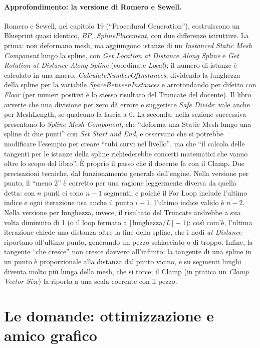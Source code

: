 \paragraph{Approfondimento: la versione di Romero e Sewell.} Romero e Sewell, nel capitolo 19
(``Procedural Generation''), costruiscono un Blueprint quasi identico, \emph{BP\_SplinePlacement},
con due differenze istruttive. La prima: non deformano mesh, ma aggiungono istanze di un
\emph{Instanced Static Mesh Component} lungo la spline, con \emph{Get Location at Distance Along
Spline} e \emph{Get Rotation at Distance Along Spline} (coordinate \emph{Local}); il numero di
istanze è calcolato in una macro, \emph{CalculateNumberOfInstances}, dividendo la lunghezza
della spline per la variabile \emph{SpaceBetweenInstances} e arrotondando per difetto con
\emph{Floor} (per numeri positivi è lo stesso risultato del Truncate del docente). Il libro
avverte che una divisione per zero dà errore e suggerisce \emph{Safe Divide}: vale anche per
MeshLength, se qualcuno la lascia a 0. La seconda: nella sezione successiva presentano lo
\emph{Spline Mesh Component}, che ``deforma una Static Mesh lungo una spline di due punti'' con
\emph{Set Start and End}, e osservano che si potrebbe modificare l'esempio per creare ``tubi
curvi nel livello'', ma che ``il calcolo delle tangenti per le istanze della spline richiederebbe
concetti matematici che vanno oltre lo scopo del libro''. È proprio il passo che il docente fa con
il Clamp. Due precisazioni tecniche, dal funzionamento generale dell'engine. Nella versione per
punto, il ``meno 2'' è corretto per una ragione leggermente diversa da quella detta: con $n$
punti ci sono $n-1$ segmenti, e poiché il For Loop include l'ultimo indice e ogni iterazione usa
anche il punto $i+1$, l'ultimo indice valido è $n-2$. Nella versione per lunghezza, invece, il
risultato del Truncate andrebbe a sua volta diminuito di 1 (o il loop fermato a
$\lfloor\text{lunghezza}/L\rfloor - 1$): così com'è, l'ultima iterazione chiede una distanza oltre
la fine della spline, che i nodi \emph{at Distance} riportano all'ultimo punto, generando un pezzo
schiacciato o di troppo. Infine, la tangente ``che cresce'' non cresce davvero all'infinito: la
tangente di una spline in un punto è proporzionale alla distanza dal punto vicino, e su segmenti
lunghi diventa molto più lunga della mesh, che si torce; il Clamp (in pratica un \emph{Clamp
Vector Size}) la riporta a una scala coerente con il pezzo.

\section{Le domande: ottimizzazione e amico grafico}
\label{ue16:sec:domandespline}

